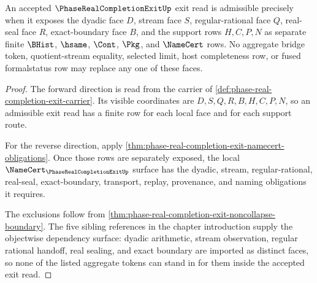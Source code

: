 \begin{theorem}
\label{thm:phase-real-completion-exit-objectwise-face-criterion}
An accepted $\PhaseRealCompletionExitUp$ exit read is admissible precisely when it exposes the dyadic face $D$, stream face $S$, regular-rational face $Q$, real-seal face $R$, exact-boundary face $B$, and the support rows $H,C,P,N$ as separate finite $\BHist$, $\hsame$, $\Cont$, $\Pkg$, and $\NameCert$ rows. No aggregate bridge token, quotient-stream equality, selected limit, host completeness row, or fused formalstatus row may replace any one of these faces.
\end{theorem}
\begin{proof}
The forward direction is read from the carrier of \autoref{def:phase-real-completion-exit-carrier}. Its visible coordinates are $D,S,Q,R,B,H,C,P,N$, so an admissible exit read has a finite row for each local face and for each support route.

For the reverse direction, apply \autoref{thm:phase-real-completion-exit-namecert-obligations}. Once those rows are separately exposed, the local $\NameCert_{\PhaseRealCompletionExitUp}$ surface has the dyadic, stream, regular-rational, real-seal, exact-boundary, transport, replay, provenance, and naming obligations it requires.

The exclusions follow from \autoref{thm:phase-real-completion-exit-noncollapse-boundary}. The five sibling references in the chapter introduction supply the objectwise dependency surface: dyadic arithmetic, stream observation, regular rational handoff, real sealing, and exact boundary are imported as distinct faces, so none of the listed aggregate tokens can stand in for them inside the accepted exit read.
\end{proof}

